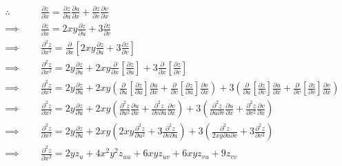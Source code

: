 \documentclass[Analysis-3]{subfiles}
\begin{document}
\begin{Eg}{}
\begin{align*}
	\therefore \hspace{1cm}	& \frac{\partial z}{\partial x } = \frac{\partial z}{\partial u} \frac{\partial u}{\partial x} + \frac{\partial z}{\partial v} \frac{\partial v}{\partial x} \\
	\implies & \frac{\partial z}{\partial x } = 2xy \frac{\partial z}{\partial u} + 3 \frac{\partial z}{\partial v}\\
    \implies & \frac{\partial^2 z}{\partial x^2 } = \frac{\partial}{\partial x} \left[ 2xy \frac{\partial z}{\partial u} + 3 \frac{\partial z}{\partial v} \right] \\
	\implies & \frac{\partial^2 z}{\partial x^2 } = 2y \frac{\partial z}{\partial u} + 2xy \frac{\partial}{\partial x} \left[\frac{\partial z}{\partial u}\right]  + 3\frac{\partial}{\partial x} \left[\frac{\partial z}{\partial v}\right] \\
	\implies & \frac{\partial^2 z}{\partial x^2 } = 2y \frac{\partial z}{\partial u} + 2xy \left(\frac{\partial}{\partial u} \left[\frac{\partial z}{\partial u}\right] \frac{\partial u}{\partial x} + \frac{\partial}{\partial v} \left[\frac{\partial z}{\partial u}\right] \frac{\partial v}{\partial x}\right)  + 3\left( \frac{\partial}{\partial u} \left[\frac{\partial z}{\partial v}\right] \frac{\partial u}{\partial x} + \frac{\partial}{\partial v} \left[\frac{\partial z}{\partial v}\right] \frac{\partial v}{\partial x} \right) \\
	\implies & \frac{\partial^2 z}{\partial x^2 } = 2y \frac{\partial z}{\partial u} + 2xy \left(\frac{\partial^2 z}{\partial u^2} \frac{\partial u}{ \partial x} + \frac{\partial^2 z}{\partial v \partial u} \frac{\partial v}{\partial x}\right)  + 3\left( \frac{\partial^2 z}{\partial u \partial v} \frac{\partial u}{ \partial x} + \frac{\partial^2 z}{\partial v^2} \frac{\partial v}{\partial x}\right) \\
	\implies & \frac{\partial^2 z}{\partial x^2 } = 2y \frac{\partial z}{\partial u} + 2xy \left(2xy \frac{\partial^2 z}{\partial u^2}  + 3 \frac{\partial^2 z}{\partial v \partial u}\right)  + 3\left( \frac{\partial^2 z}{2xy \partial u \partial v}  + 3 \frac{\partial^2 z}{\partial v^2} \right) \\ 
	\implies & \boxed{\frac{\partial^2 z}{\partial x^2 } = 2y z_u + 4x^2y^2z_{uu}+ 6xy z_{uv} + 6xy z_{vu} + 9z_{vv}}
\end{align*}


\end{Eg}
\end{document}
